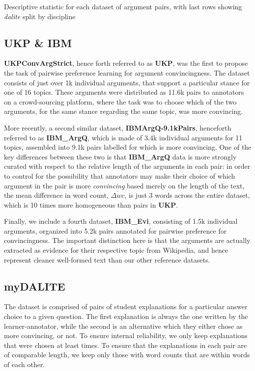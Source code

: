 \documentclass[runningheads]{llncs}
\begin{document}
\begin{table}
	\caption{Descriptive statistic for each dataset of argument pairs, with 
		last rows showing \textit{dalite} split by discipline}
	
	\label{tab:data_summary}
\end{table}


\subsection{UKP \& IBM}
\textbf{UKPConvArgStrict}\cite{habernal_which_2016}, hence forth referred to as 
\textbf{UKP}, was the first to propose the task of pairwise preference learning 
for argument convincingness. 
The dataset consists of just over 1k individual arguments, that support a 
particular stance for one of 16 topics. 
These arguments were distributed as 11.6k pairs to annotators on a 
crowd-sourcing platform, where the task was to choose which of the two 
arguments, for the same stance regarding the same topic, was more convincing. 

More recently, a second similar dataset, 
\textbf{IBMArgQ-9.1kPairs}\cite{toledo_automatic_2019}, henceforth 
referred to as \textbf{IBM\_ArgQ}, which is made of 3.4k individual arguments 
for 11 topics, assembled into 9.1k pairs labelled for which is more convincing. 
One of the key differences between these two is that \textbf{IBM\_ArgQ} data is 
more strongly curated with respect to the relative length of the arguments in 
each pair: in order to control for the possibility that annotators may make 
their choice of which argument in the pair is more \textit{convincing} based 
merely on the length of the text, the mean difference in word count, 
$\overline{\Delta wc}$, is just 3 words across the entire dataset, which is 10 
times more homogeneous than pairs in \textbf{UKP}.

Finally, we include a fourth dataset, \textbf{IBM\_Evi}, consisting of 1.5k 
individual arguments, organized into 5.2k pairs annotated for pairwise 
preference for convincingness\cite{gleize_are_2019}. The important distinction 
here is that the arguments are actually extracted as evidence for their 
respective topic from Wikipedia, and hence represent cleaner well-formed text 
than our other reference datasets.


\subsection{myDALITE}
The dataset is comprised of pairs of student explanations for a particular 
answer choice to a given question. 
The first explanation is always the one written by the learner-annotator, while 
the second is an alternative which they either chose as more convincing, or 
not. 
To ensure internal reliability, we only keep explanations that were chosen at 
least times. 
To ensure that the explanations in each pair are of comparable length, we keep 
only those with word counts that are within 
words of each other. 
\end{document}
